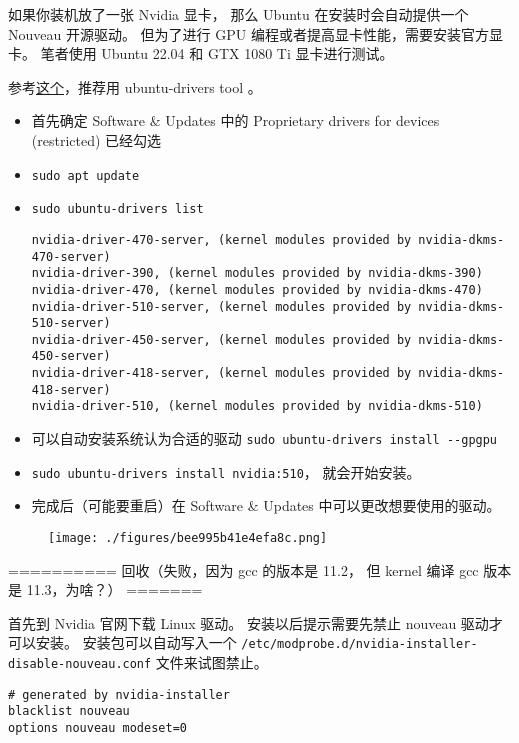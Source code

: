 
如果你装机放了一张 Nvidia 显卡， 那么 Ubuntu 在安装时会自动提供一个 Nouveau 开源驱动。 但为了进行 GPU 编程或者提高显卡性能，需要安装官方显卡。 笔者使用 Ubuntu 22.04 和 GTX 1080 Ti 显卡进行测试。

参考\href{https://ubuntu.com/server/docs/nvidia-drivers-installation}{这个}，推荐用 ubuntu-drivers tool 。

\begin{itemize}
\item 首先确定 Software & Updates 中的 Proprietary drivers for devices (restricted) 已经勾选
\item \verb`sudo apt update`
\item \verb`sudo ubuntu-drivers list`
\begin{lstlisting}[language=none]
nvidia-driver-470-server, (kernel modules provided by nvidia-dkms-470-server)
nvidia-driver-390, (kernel modules provided by nvidia-dkms-390)
nvidia-driver-470, (kernel modules provided by nvidia-dkms-470)
nvidia-driver-510-server, (kernel modules provided by nvidia-dkms-510-server)
nvidia-driver-450-server, (kernel modules provided by nvidia-dkms-450-server)
nvidia-driver-418-server, (kernel modules provided by nvidia-dkms-418-server)
nvidia-driver-510, (kernel modules provided by nvidia-dkms-510)
\end{lstlisting}
\item 可以自动安装系统认为合适的驱动 \verb`sudo ubuntu-drivers install --gpgpu`
\item \verb`sudo ubuntu-drivers install nvidia:510`， 就会开始安装。
\item 完成后（可能要重启）在 Software & Updates 中可以更改想要使用的驱动。
\end{itemize}
\begin{figure}[ht]
\centering
\texttt{[image: ./figures/bee995b41e4efa8c.png]}
\caption{} \label{fig_NvDrUb_1}
\end{figure}




========== 回收（失败，因为 gcc 的版本是 11.2， 但 kernel 编译 gcc 版本是 11.3，为啥？） =======

首先到 Nvidia 官网下载 Linux 驱动。 安装以后提示需要先禁止 nouveau 驱动才可以安装。 安装包可以自动写入一个 \verb`/etc/modprobe.d/nvidia-installer-disable-nouveau.conf` 文件来试图禁止。
\begin{lstlisting}[language=none,caption=nvidia-installer-disable-nouveau.conf]
# generated by nvidia-installer
blacklist nouveau
options nouveau modeset=0
\end{lstlisting}

